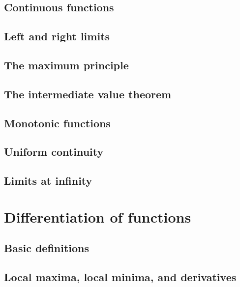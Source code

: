 \documentclass[
]{book}
\theoremstyle{definition}
\theoremstyle{definition}
\theoremstyle{definition}
\theoremstyle{definition}
\theoremstyle{remark}
\begin{document}
\section{Continuous functions}\label{continuous-functions}

\section{Left and right limits}\label{left-and-right-limits}

\section{The maximum principle}\label{the-maximum-principle}

\section{The intermediate value theorem}\label{the-intermediate-value-theorem}

\section{Monotonic functions}\label{monotonic-functions}

\section{Uniform continuity}\label{uniform-continuity}

\section{Limits at infinity}\label{limits-at-infinity}

\chapter{Differentiation of functions}\label{diff}

\section{Basic definitions}\label{basic-definitions}

\section{Local maxima, local minima, and derivatives}\label{local-maxima-local-minima-and-derivatives}
\end{document}
